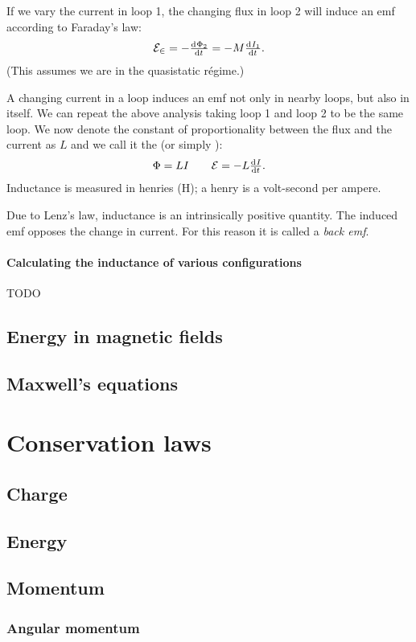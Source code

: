 If we vary the current in loop 1, the changing flux in loop 2 will induce an emf according to Faraday's law:
\[ \mathcal{E_2} = - \od{\Phi_2}{t} = - M \od{I_1}{t}. \]
(This assumes we are in the quasistatic régime.)

A changing current in a loop induces an emf not only in nearby loops, but also in itself. We can repeat the above analysis taking loop 1 and loop 2 to be the same loop. We now denote the constant of proportionality between the flux and the current as $L$ and we call it the  (or simply ):
\[ \Phi = LI \qquad \mathcal{E} = - L \od{I}{t}. \]
Inductance is measured in henries (H); a henry is a volt-second per ampere.

Due to Lenz's law, inductance is an intrinsically positive quantity. The induced emf opposes the change in current. For this reason it is called a \textit{back emf}.

\subsubsection{Calculating the inductance of various configurations}
TODO

\section{Energy in magnetic fields}

\section{Maxwell's equations}

\chapter{Conservation laws}
\section{Charge}
\section{Energy}
\section{Momentum}
\subsection{Angular momentum}

